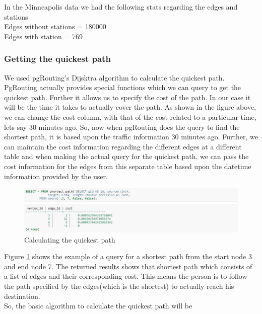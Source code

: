 \documentclass[a4paper,12pt, notitlepage, oneside, onecolumn]{article}
\begin{document}
In the Minneapolis data we had the following stats regarding the edges and stations\\
Edges without stations = 180000\\
Edges with station = 769\\

\subsubsection{Getting the quickest path}

We used pgRouting's Dijsktra algorithm to calculate the quickest path. PgRouting actually provides special functions which we can query to get the quickest path. Further it allows us to specify the cost of the path. In our case it will be the time it takes to actually cover the path. As shown in the figure above, we can change the cost column, with that of the cost related to a particular time, lets say 30 minutes ago. So, now when pgRouting does the query to find the shortest path, it is based upon the traffic information 30 minutes ago. Further, we can maintain the cost information regarding the different edges at a different table and when making the actual query for the quickest path, we can pass the cost information for the edges from this separate table based upon the datetime information provided by the user.

\begin{figure}[H]
\begin{minipage}[b]{1.0\linewidth}
\centering
\includegraphics[scale=0.5]{shortest_path.jpg}
\caption{Calculating the quickest path}
\label{fig:quickest_path}
\end{minipage}
\centering
\end{figure}

Figure \ref{fig:quickest_path} shows the example of a query for a shortest path from the start node 3 and end node 7. The returned results shows that shortest path which consists of a list of edges and their corresponding cost. This means the person is to follow the path specified by the edges(which is the shortest) to actually reach his destination.\\

So, the basic algorithm to calculate the quickest path will be
\end{document}
